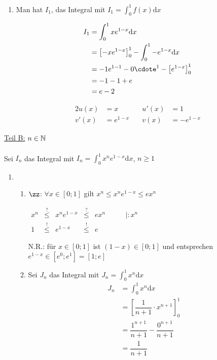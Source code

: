 \documentclass[main.tex]{subfiles}
\begin{document}
\begin{Beweis}
\begin{enumerate}
\item Man hat $I_1$,  das Integral mit $I_1=\int_0^1f(x)\mbox{d}x$\\
\begin{minipage}{0.5\textwidth}
\begin{align*}
I_1&=\int_0^1xe^{1-x}\mbox{d}x\\
&=\left[-xe^{1-x}\right]_0^1-\int_0^1-e^{1-x}\mbox{d}x\\
&=-1e^{1-1}-0\cdote^1-\left[e^{1-x}\right]_0^1\\
&=-1-1+e\\
&=e-2
\end{align*}
\end{minipage}
\begin{minipage}{0.5\textwidth}
\begin{alignat*}{2}
u(x)&=x \quad& u\prime(x)&=1\\
v'(x)&=e^{1-x}\quad & v(x)&=-e^{1-x}
\end{alignat*}
\end{minipage}
\end{enumerate}
\underline{Teil B:} $n\in\mathbb{N}$\\\\
Sei $I_n$ das Integral mit $I_n=\int_0^1x^ne^{1-x}\mbox{d}x$, $n\geq 1$\\
\begin{enumerate}
\item %
\begin{enumerate}
\item $\zz$: $\forall x\in[0;1]$ gilt $x^n\leq x^ne^{1-x} \leq ex^n$\\
\begin{center}
$\begin{array}{cccccc}
x^n &\stackrel{?}{\leq}& x^ne^{1-x} &\stackrel{?}{\leq}& ex^n&\qquad|:x^n\\
1        &\stackrel{!}{\leq}&e^{1-x}         &\stackrel{!}{\leq}&e        &
\end{array}$
\end{center}
N.R.: für $x\in[0;1]$ ist $(1-x)\in[0;1]$ und entsprechen $e^{1-x}\in[e^{0};e^{1}]=[1;e]$
\item Sei $J_n$ das Integral mit $J_n=\int_0^1x^n\mbox{d}x$
\begin{align*}
J_n&=\int_0^1x^n\mbox{d}x\\
&=\left[\dfrac{1}{n+1}\cdot x^{n+1}\right]_0^1\\
&=\dfrac{1^{n+1}}{n+1}-\dfrac{0^{n+1}}{n+1}\\
&=\dfrac{1}{n+1}
\end{align*}

\end{enumerate}
\end{enumerate}
\end{Beweis}
\end{document}
